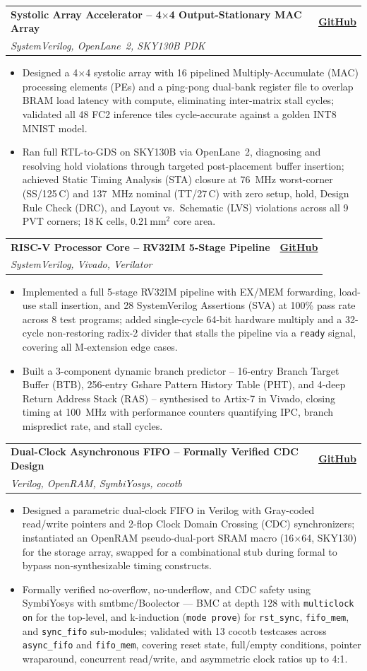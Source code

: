 \documentclass[letterpaper,11pt]{article}
\makeatletter
\newcommand{\resumeItem}[1]{
  \item\small{{#1\vspace{-1pt}}}
}
\newcommand{\resumeProjectHeading}[3]{
    \item
    \begin{tabular*}{0.97\textwidth}{l@{\extracolsep{\fill}}r}
      \textbf{\small#1} & \textbf{\small #2} \\
      \textit{\small#3} & \\
    \end{tabular*}\vspace{-7pt}
}
\newcommand{\resumeItemListStart}{\begin{itemize}[leftmargin=0.15in, itemsep=0pt, parsep=0pt, topsep=1pt]}
\newcommand{\resumeItemListEnd}{\end{itemize}\vspace{-2pt}}
\makeatother
\begin{document}
  \resumeProjectHeading
    {Systolic Array Accelerator -- 4$\times$4 Output-Stationary MAC Array}
    {\href{https://github.com/Aditya-1020/AdiSystolic}{GitHub}}
    {SystemVerilog, OpenLane~2, SKY130B PDK}
  \resumeItemListStart
    \resumeItem{Designed a 4$\times$4 systolic array with 16 pipelined Multiply-Accumulate (MAC) processing elements (PEs) and a ping-pong dual-bank register file to overlap BRAM load latency with compute, eliminating inter-matrix stall cycles; validated all 48 FC2 inference tiles cycle-accurate against a golden INT8 MNIST model.}
    \resumeItem{Ran full RTL-to-GDS on SKY130B via OpenLane~2, diagnosing and resolving hold violations through targeted post-placement buffer insertion; achieved Static Timing Analysis (STA) closure at 76~MHz worst-corner (SS/125\,\textdegree{}C) and 137~MHz nominal (TT/27\,\textdegree{}C) with zero setup, hold, Design Rule Check (DRC), and Layout vs.\ Schematic (LVS) violations across all 9 PVT corners; 18\,K cells, 0.21\,mm$^{2}$ core area.}
  \resumeItemListEnd

  \vspace{0pt}

  \resumeProjectHeading
    {RISC-V Processor Core -- RV32IM 5-Stage Pipeline}
    {\href{https://github.com/Aditya-1020/AdiRiscV}{GitHub}}
    {SystemVerilog, Vivado, Verilator}
  \resumeItemListStart
    \resumeItem{Implemented a full 5-stage RV32IM pipeline with EX/MEM forwarding, load-use stall insertion, and 28 SystemVerilog Assertions (SVA) at 100\% pass rate across 8 test programs; added single-cycle 64-bit hardware multiply and a 32-cycle non-restoring radix-2 divider that stalls the pipeline via a \texttt{ready} signal, covering all M-extension edge cases.}
    \resumeItem{Built a 3-component dynamic branch predictor -- 16-entry Branch Target Buffer (BTB), 256-entry Gshare Pattern History Table (PHT), and 4-deep Return Address Stack (RAS) -- synthesised to Artix-7 in Vivado, closing timing at 100~MHz with performance counters quantifying IPC, branch mispredict rate, and stall cycles.}
  \resumeItemListEnd

  \vspace{0pt}

\resumeProjectHeading
    {Dual-Clock Asynchronous FIFO -- Formally Verified CDC Design}
    {\href{https://github.com/Aditya-1020/async}{GitHub}}
    {Verilog, OpenRAM, SymbiYosys, cocotb}
  \resumeItemListStart
    \resumeItem{Designed a parametric dual-clock FIFO in Verilog with Gray-coded read/write pointers and 2-flop Clock Domain Crossing (CDC) synchronizers; instantiated an OpenRAM pseudo-dual-port SRAM macro (16$\times$64, SKY130) for the storage array, swapped for a combinational stub during formal to bypass non-synthesizable timing constructs.}
    \resumeItem{Formally verified no-overflow, no-underflow, and CDC safety using SymbiYosys with smtbmc/Boolector --- BMC at depth 128 with \texttt{multiclock on} for the top-level, and k-induction (\texttt{mode prove}) for \texttt{rst\_sync}, \texttt{fifo\_mem}, and \texttt{sync\_fifo} sub-modules; validated with 13 cocotb testcases across \texttt{async\_fifo} and \texttt{fifo\_mem}, covering reset state, full/empty conditions, pointer wraparound, concurrent read/write, and asymmetric clock ratios up to 4:1.}
  \resumeItemListEnd
\end{document}
